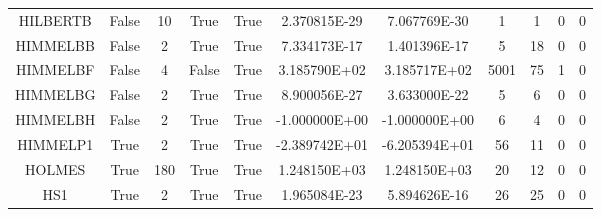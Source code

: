 \begin{longtable}{ccccccccccc}
	\cellcolor{default1} HILBERTB& \cellcolor{default1} False& \cellcolor{default1} 10& \cellcolor{default1} True& \cellcolor{default1} True& \cellcolor{ok} 2.370815E-29& \cellcolor{best} 7.067769E-30& \cellcolor{best} 1& \cellcolor{best} 1& \cellcolor{default1} 0& \cellcolor{default1} 0\\
	\cellcolor{default2} HIMMELBB& \cellcolor{default2} False& \cellcolor{default2} 2& \cellcolor{default2} True& \cellcolor{default2} True& \cellcolor{ok} 7.334173E-17& \cellcolor{best} 1.401396E-17& \cellcolor{best} 5& \cellcolor{poor} 18& \cellcolor{default2} 0& \cellcolor{default2} 0\\
	\cellcolor{default1} HIMMELBF& \cellcolor{default1} False& \cellcolor{default1} 4& \cellcolor{default1} False& \cellcolor{default1} True& \cellcolor{ok} 3.185790E+02& \cellcolor{best} 3.185717E+02& \cellcolor{poor} 5001& \cellcolor{best} 75& \cellcolor{default1} 1& \cellcolor{default1} 0\\
	\cellcolor{default2} HIMMELBG& \cellcolor{default2} False& \cellcolor{default2} 2& \cellcolor{default2} True& \cellcolor{default2} True& \cellcolor{best} 8.900056E-27& \cellcolor{ok} 3.633000E-22& \cellcolor{best} 5& \cellcolor{ok} 6& \cellcolor{default2} 0& \cellcolor{default2} 0\\
	\cellcolor{default1} HIMMELBH& \cellcolor{default1} False& \cellcolor{default1} 2& \cellcolor{default1} True& \cellcolor{default1} True& \cellcolor{best} -1.000000E+00& \cellcolor{best} -1.000000E+00& \cellcolor{ok} 6& \cellcolor{best} 4& \cellcolor{default1} 0& \cellcolor{default1} 0\\
	\cellcolor{default2} HIMMELP1& \cellcolor{default2} True& \cellcolor{default2} 2& \cellcolor{default2} True& \cellcolor{default2} True& \cellcolor{poor} -2.389742E+01& \cellcolor{best} -6.205394E+01& \cellcolor{poor} 56& \cellcolor{best} 11& \cellcolor{default2} 0& \cellcolor{default2} 0\\
	\cellcolor{default1} HOLMES& \cellcolor{default1} True& \cellcolor{default1} 180& \cellcolor{default1} True& \cellcolor{default1} True& \cellcolor{ok} 1.248150E+03& \cellcolor{best} 1.248150E+03& \cellcolor{ok} 20& \cellcolor{best} 12& \cellcolor{default1} 0& \cellcolor{default1} 0\\
	\cellcolor{default2} HS1& \cellcolor{default2} True& \cellcolor{default2} 2& \cellcolor{default2} True& \cellcolor{default2} True& \cellcolor{best} 1.965084E-23& \cellcolor{ok} 5.894626E-16& \cellcolor{ok} 26& \cellcolor{best} 25& \cellcolor{default2} 0& \cellcolor{default2} 0\\

\end{longtable}
